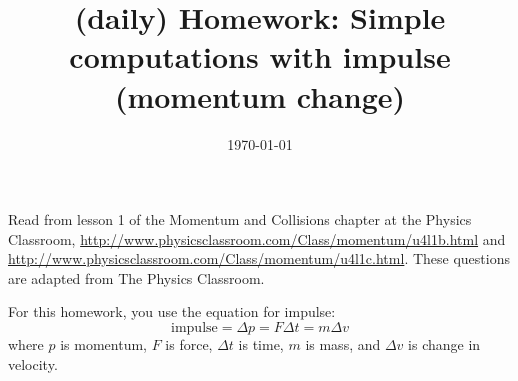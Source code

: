 \documentclass[hw,addpoints,noanswers]{exam}
\title{(daily) Homework: Simple computations with impulse (momentum change)}
\author{\mobeardInstructorShort}
\date{\today}
\begin{document}
\maketitle

Read from lesson 1 of the Momentum and Collisions chapter at the Physics Classroom, \url{http://www.physicsclassroom.com/Class/momentum/u4l1b.html} and \url{http://www.physicsclassroom.com/Class/momentum/u4l1c.html}. These questions are adapted from The Physics Classroom. 

For this homework, you use the equation for impulse:
\begin{equation}
\text{impulse} = \Delta p = F \Delta t = m \Delta v
\end{equation}
where $p$ is momentum, $F$ is force, $\Delta t$ is time, $m$ is mass, and $\Delta v$ is change in velocity. 
\end{document}
